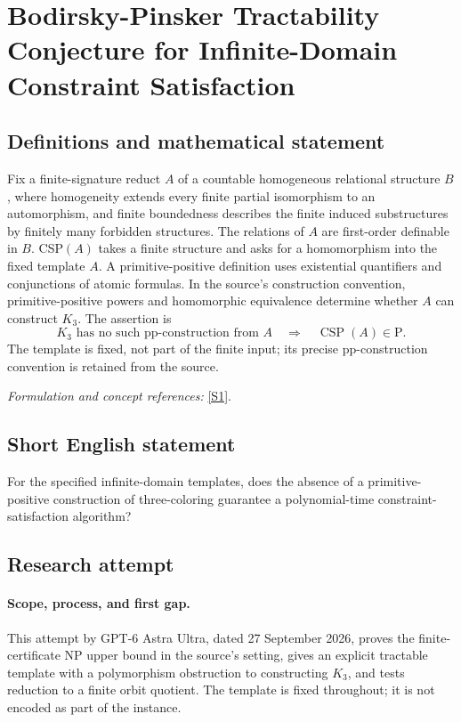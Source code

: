 \documentclass[11pt]{article}
\begin{document}
\section*{\texorpdfstring{Bodirsky-Pinsker Tractability Conjecture for Infinite-Domain Constraint Satisfaction}{Bodirsky-Pinsker Tractability Conjecture for Infinite-Domain Constraint Satisfaction}}\label{statement}
\subsection{Definitions and mathematical statement}
Fix a finite-signature reduct $A$ of a countable homogeneous relational structure $B$, where homogeneity extends every finite partial isomorphism to an automorphism, and finite boundedness describes the finite induced substructures by finitely many forbidden structures. The relations of $A$ are first-order definable in $B$. CSP$(A)$ takes a finite structure and asks for a homomorphism into the fixed template $A$. A primitive-positive definition uses existential quantifiers and conjunctions of atomic formulas. In the source's construction convention, primitive-positive powers and homomorphic equivalence determine whether $A$ can construct $K_3$. The assertion is
\[
 K_3\text{ has no such pp-construction from }A
 \quad\Longrightarrow\quad\operatorname{CSP}(A)\in\mathrm P.
\]
The template is fixed, not part of the finite input; its precise pp-construction convention is retained from the source.
\par\smallskip\textit{Formulation and concept references:} \href{https://arxiv.org/html/2502.06621v4}{[S1]}.

\subsection{Short English statement}
For the specified infinite-domain templates, does the absence of a primitive-positive construction of three-coloring guarantee a polynomial-time constraint-satisfaction algorithm?
\subsection{Research attempt}
\paragraph{Scope, process, and first gap.}
This attempt by GPT-6 Astra Ultra, dated 27 September 2026, proves the finite-certificate NP upper bound in the source's setting, gives an explicit tractable template with a polymorphism obstruction to constructing $K_3$, and tests reduction to a finite orbit quotient. The template is fixed throughout; it is not encoded as part of the instance.
\end{document}
